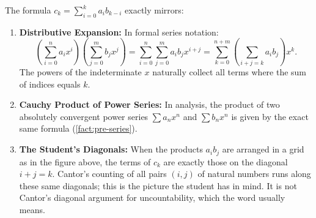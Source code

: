 \begin{content}
\begin{center}
\end{center}

\begin{steps}
The formula $c_k = \sum_{i=0}^k a_i b_{k-i}$ exactly mirrors:
\begin{enumerate}[label=\textbf{(\arabic*)}]
    \item \textbf{Distributive Expansion:} In formal series notation:
    \[
    \left(\sum_{i=0}^n a_i x^i\right)\left(\sum_{j=0}^m b_j x^j\right) = \sum_{i=0}^n \sum_{j=0}^m a_i b_j x^{i+j} = \sum_{k=0}^{n+m} \left(\sum_{i+j=k} a_i b_j\right) x^k.
    \]
    The powers of the indeterminate $x$ naturally collect all terms where the sum of indices equals $k$.
    \item \textbf{Cauchy Product of Power Series:} In analysis, the product of two absolutely convergent power series $\sum a_n x^n$ and $\sum b_n x^n$ is given by the exact same formula (\cref{fact:pre-series}).
    \item \textbf{The Student's Diagonals:} When the products $a_i b_j$ are arranged in a grid as in the figure above, the terms of $c_k$ are exactly those on the diagonal $i + j = k$. Cantor's counting of all pairs $(i, j)$ of natural numbers runs along these same diagonals; this is the picture the student has in mind. It is not Cantor's diagonal argument for uncountability, which the word  usually means.
\end{enumerate}
\end{steps}
\end{content}

